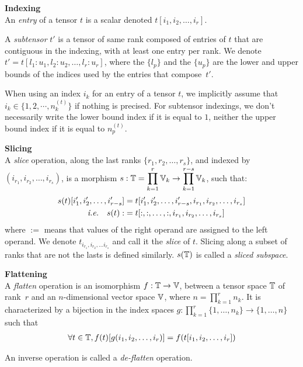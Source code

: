 \begin{definition}\textbf{Indexing}\\
An \emph{entry} of a tensor $t$ is a scalar denoted $t[i_1, i_2, \ldots, i_r]$.

A \emph{subtensor} $t'$ is a tensor of same rank composed of entries of $t$ that are contiguous in the indexing, with at least one entry per rank. We denote $t' = t[l_1{:}u_1, l_2{:}u_2, \ldots, l_r{:}u_r]$, where the $\{l_p\}$ and the $\{u_p\}$ are the lower and upper bounds of the indices used by the entries that compose~$t'$.
\end{definition}

When using an index $i_k$ for an entry of a tensor $t$, we implicitly assume that $i_k \in \{1, 2, \cdots, n_k^{(t)}\}$ if nothing is precised.
For subtensor indexings, we don't necessarily write the lower bound index if it is equal to $1$, neither the upper bound index if it is equal to $n_p^{(t)}$.

\begin{definition}\textbf{Slicing}\\
A \emph{slice} operation, along the last ranks $\{r_1, r_2, \ldots, r_s\}$, and indexed by $(i_{r_1}, i_{r_2}, \ldots, i_{r_s})$, is a morphism $s: \mathbb{T} = \displaystyle \prod_{k=1}^r \mathbb{V}_k \rightarrow \prod_{k=1}^{r-s} \mathbb{V}_k$, such that:
\begin{align*}
s(t)[i'_1, i'_2, \ldots, i'_{r-s}] &= t[i'_1, i'_2, \ldots, i'_{r-s}, i_{r_1}, i_{r_2}, \ldots, i_{r_s}] \\
\text{ \emph{i.e.}} \quad s(t) :&= t[:,:, \ldots, :, i_{r_1}, i_{r_2}, \ldots, i_{r_s}]
\end{align*}
where $:=$ means that values of the right operand are assigned to the left operand.
We denote $t_{i_{r_1}, i_{r_2}, \ldots i_{r_s}}$ and call it the \emph{slice} of $t$. 
Slicing along a subset of ranks that are not the lasts is defined similarly.
$s(\mathbb{T})$ is called a \emph{sliced subspace}.
\end{definition}

\begin{definition}\textbf{Flattening}\\
A \emph{flatten} operation is an isomorphism $f: \mathbb{T} \rightarrow \mathbb{V}$, between a tensor space $\mathbb{T}$ of rank~$r$ and an $n$-dimensional vector space $\mathbb{V}$, where $n =\displaystyle \prod_{k=1}^r n_k$. It is characterized by a bijection in the index spaces $g: \displaystyle \prod_{k=1}^r \{1, \ldots, n_k \} \rightarrow\{1, \ldots, n \}$ such that
\begin{gather*}
  \forall t \in \mathbb{T}, f(t)[g(i_1, i_2, \ldots, i_r)] = f(t[i_1, i_2, \ldots, i_r])
\end{gather*}

An inverse operation is called a \emph{de-flatten} operation.
\end{definition}

